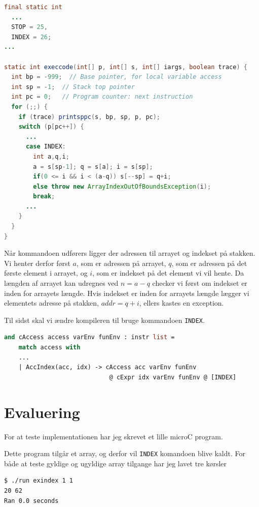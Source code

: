 \documentclass[danish,a4paper]{report}
\begin{document}
\begin{lstlisting}[language=java]
final static int 
  ...
  STOP = 25,
  INDEX = 26;
...

static int execcode(int[] p, int[] s, int[] iargs, boolean trace) {
  int bp = -999;  // Base pointer, for local variable access 
  int sp = -1;  // Stack top pointer
  int pc = 0;   // Program counter: next instruction
  for (;;) {
    if (trace) printsppc(s, bp, sp, p, pc);
    switch (p[pc++]) {
      ...
      case INDEX:
        int a,q,i;
        a = s[sp-1]; q = s[a]; i = s[sp];
        if(0 <= i && i < (a-q)) s[--sp] = q+i;
        else throw new ArrayIndexOutOfBoundsException(i);
        break;
      ...
    }
  }
}
\end{lstlisting}

Når kommandoen udførers ligger der adressen til arrayet og indekset på stakken. Vi henter derfor først $a$, som er adressen på arrayet, $q$, som er adressen på det første element i arrayet, og $i$, som er indekset på det element vi vil hente. Da længden af arrayet kan udregnes ved $n = a - q$ checker vi først om indekset er inden for arrayets længde. Hvis indekset er inden for arrayets længde lægger vi elementets adresse på stakken, $addr = q+i$, ellers kastes en exception.

Til sidst skal vi ændre kompileren til bruge kommandoen \texttt{INDEX}.

\begin{lstlisting}[language=ML]
and cAccess access varEnv funEnv : instr list =
    match access with 
    ...
    | AccIndex(acc, idx) -> cAccess acc varEnv funEnv 
                             @ cExpr idx varEnv funEnv @ [INDEX]
\end{lstlisting}

\section*{Evaluering}

For at teste implementationen har jeg skrevet et lille microC program.



Dette program tilgår et array, og derfor vil \texttt{INDEX} komandoen blive kaldt. For både at teste gyldige og ugyldige array tilgange har jeg lavet tre kørsler

\begin{lstlisting}[language=bash]
$ ./run exindex 1 1
20 62
Ran 0.0 seconds
\end{lstlisting}
\end{document}
